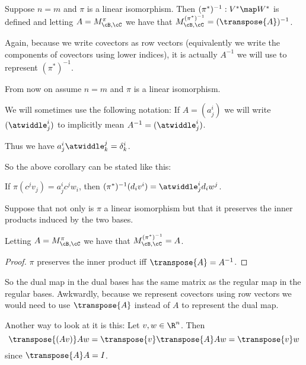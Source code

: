 \documentclass[oneside,12pt]{amsart}
\begin{document}
\begin{corollary}
Suppose $n=m$ and $\pi$ is a linear isomorphism. Then
$(\pi^*)^{-1}:V^* \map W^*$ is defined
and letting $A = M^{\pi}_{\cB,\cC}$ we have that
$M^{(\pi^*)^{-1}}_{\cB,\cC} = (\transpose{A})^{-1}$.

Again, because we write covectors as row vectors (equivalently we write the components of covectors using lower indices), it is actually $A^{-1}$ we will use to represent $(\pi^*)^{-1}.$

\end{corollary}

From now on assume $n=m$ and $\pi$ is a linear isomorphism. 

We will sometimes use the following notation:
If $A =(a^i_j)$ we will write $(\atwiddle^i_j)$ to implicitly
mean $A^{-1} = (\atwiddle^i_j)$.

Thus we have $a^i_j \atwiddle^j_k = \delta^i_k$.

So the above corollary can be stated like this:

If $\pi(c^j v_j) = a^i_j c^j w_i$, then
$(\pi^*)^{-1} (d_i v^i) = \atwiddle^i_j d_i w^j$.


\begin{corollary}
Suppose that not only is $\pi$ a linear isomorphism but that it preserves
the inner products induced by the two bases.

Letting $A = M^{\pi}_{\cB,\cC}$ we have that
$M^{(\pi^*)^{-1}}_{\cB,\cC} = A$.
\end{corollary}
\begin{proof}
$\pi$ preserves the inner product iff $\transpose{A} = A^{-1}$.
\end{proof}

\begin{note}
So the dual map in the dual bases has the same matrix as the
regular map in the regular bases.
Awkwardly, because we represent covectors using row vectors we would
need to use $\transpose{A}$ instead of $A$ to represent the dual map.

Another way to look at it is this: Let $v,w\in\R^n$. Then
$$\transpose{(Av)}Aw = \transpose{v}\transpose{A}Aw = \transpose{v}w$$
since $\transpose{A}A = I$.
\end{note}





\end{document}

